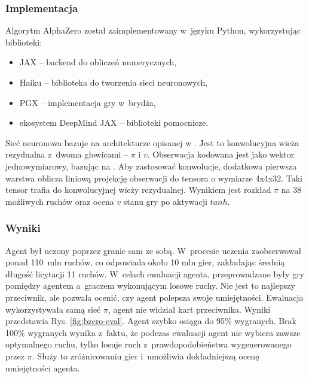 \subsubsection{Implementacja}

Algorytm AlphaZero został zaimplementowany w~języku Python,
wykorzystując biblioteki:
\begin{itemize}
  \item JAX \cite{JAX} -- backend do obliczeń numerycznych,
  \item Haiku \cite{Haiku} -- biblioteka do tworzenia sieci neuronowych,
  \item PGX \cite{PGX} -- implementacja gry w~brydża,
  \item ekosystem DeepMind JAX \cite{JAXEcosystem} -- biblioteki pomocnicze.
\end{itemize}

Sieć neuronowa bazuje na architekturze opisanej w \cite{AlphaZeroPaper}.
Jest to konwolucyjna wieża rezydualna z~dwoma głowicami -- $\pi$ i $v$.
Obserwacja kodowana jest jako wektor jednowymiarowy,
bazując na \cite{lockhart20}.
Aby zastosować konwolucje, dodatkowa pierwsza warstwa
oblicza liniową projekcję obserwacji do tensora
o wymiarze 4x4x32. Taki tensor trafia do konwolucyjnej wieży rezydualnej.
Wynikiem jest rozkład $\pi$ na 38 możliwych ruchów oraz
ocena $v$ stanu gry po aktywacji $tanh$.

\subsubsection{Wyniki}



Agent był uczony poprzez granie sam ze sobą.
W~procesie uczenia zaobserwował ponad 110~mln ruchów,
co odpowiada około 10 mln gier, zakładając średnią
długość licytacji 11 ruchów.
W~celach ewaluacji agenta, przeprowadzane
były gry pomiędzy agentem a~graczem wykonującym
losowe ruchy.
Nie jest to najlepszy przeciwnik, ale pozwala
ocenić, czy agent polepsza swoje umiejętności.
Ewaluacja wykorzystywała samą sieć $\pi$,
agent nie widział kart przeciwnika.
Wyniki przedstawia Rys. \ref{fig:bzero-eval}.
Agent szybko osiąga do 95\% wygranych.
Brak 100\% wygranych wynika z~faktu, że
podczas ewaluacji agent nie wybiera zawsze optymalnego ruchu,
tylko losuje ruch z~prawdopodobieństwa
wygenerowanego przez $\pi$.
Służy to zróżnicowaniu gier i~umożliwia
dokładniejszą ocenę umiejętności agenta.

